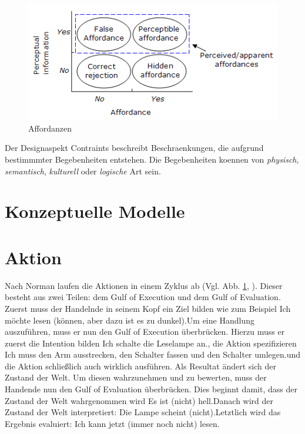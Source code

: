 \documentclass[parskip,headsepline, headtopline, %
footsepline, oneside, 12pt, headings=small]{scrreprt}
\begin{document}
\begin{figure}
\includegraphics{images/figure2_affordances.png}
\caption{Affordanzen}
\label{fig:action}
\end{figure}

Der Designaspekt Contraints beschreibt Beschraenkungen, die aufgrund bestimmmter Begebenheiten entstehen. Die Begebenheiten koennen von \textit{physisch}, \textit{semantisch}, \textit{kulturell} oder \textit{logische} Art sein.

\section{Konzeptuelle Modelle}


\section{Aktion}

Nach Norman laufen die Aktionen in einem Zyklus ab (Vgl. Abb. \ref{fig:action}, \cite[S. 46ff]{don}). Dieser besteht aus zwei Teilen: dem Gulf of Execution und dem Gulf of Evaluation. Zuerst muss der Handelnde in seinem Kopf ein Ziel bilden wie zum Beispiel \glqq Ich möchte lesen (können, aber dazu ist es zu dunkel).\grqq Um eine Handlung auszuführen, muss er nun den Gulf of Execution überbrücken. Hierzu muss er zuerst die Intention bilden \glqq Ich schalte die Leselampe an.\grqq, die Aktion spezifizieren \glqq Ich muss den Arm ausstrecken, den Schalter fassen und den Schalter umlegen.\grqq und die Aktion schließlich auch wirklich ausführen. Als Resultat ändert sich der Zustand der Welt. Um diesen wahrzunehmen und zu bewerten, muss der Handende nun den Gulf of Evaluation überbrücken. Dies beginnt damit, dass der Zustand der Welt wahrgenommen wird \glqq Es ist (nicht) hell.\grqq Danach wird der Zustand der Welt interpretiert: \glqq Die Lampe scheint (nicht).\grqq Letztlich wird das Ergebnis evaluiert: \glqq Ich kann jetzt (immer noch nicht) lesen.\grqq
\end{document}
